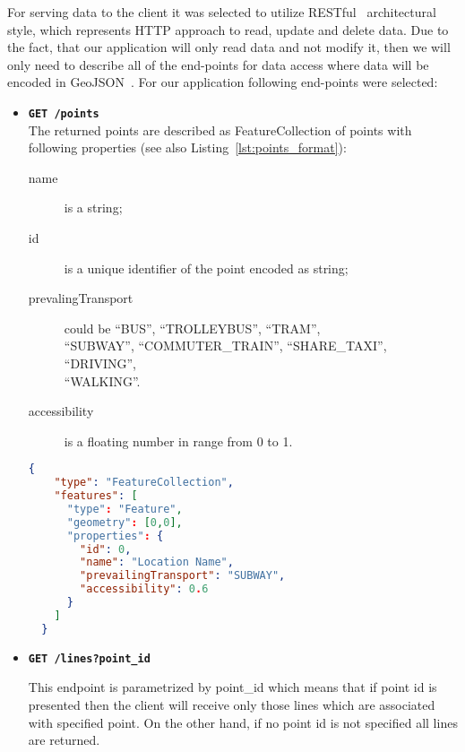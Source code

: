 For serving data to the client it was selected to utilize RESTful~\cite{rest:wiki} architectural
style, which represents HTTP approach to read, update and delete data. Due to the fact, that our
application will only read data and not modify it, then we will only need to describe all of
the end-points for data access where data will be encoded in GeoJSON~\cite{geojson:spec}.
For our application following end-points were selected:

\begin{itemize}
  \item \textbf{\texttt{GET /points}} \\
  The returned points are described as FeatureCollection of points with following
  properties (see also Listing~\ref{lst:points_format}):

  \begin{description}
    \item[name] is a string;
    \item[id] is a unique identifier of the point encoded as string;
    \item[prevalingTransport] could be \mbox{``BUS''}, \mbox{``TROLLEYBUS''},
    \mbox{``TRAM''}, \\ \mbox{``SUBWAY''}, \mbox{``COMMUTER\_TRAIN''}, \mbox{``SHARE\_TAXI''},
    \mbox{``DRIVING''}, \\ \mbox{``WALKING''}.
    \item[accessibility] is a floating number in range from 0 to 1.
  \end{description}

  \begin{lstlisting}[language=json, caption=Points response example, label=lst:points_format]
  {
    "type": "FeatureCollection",
    "features": [
      "type": "Feature",
      "geometry": [0,0],
      "properties": {
        "id": 0,
        "name": "Location Name",
        "prevailingTransport": "SUBWAY",
        "accessibility": 0.6
      }
    ]
  }
  \end{lstlisting}

  \item \textbf{\texttt{GET /lines?point\_id}}

  This endpoint is parametrized by point\_id which means that if point id is presented
  then the client will receive only those lines which are associated with specified point.
  On the other hand, if no point id is not specified all lines are returned.


\end{itemize}
